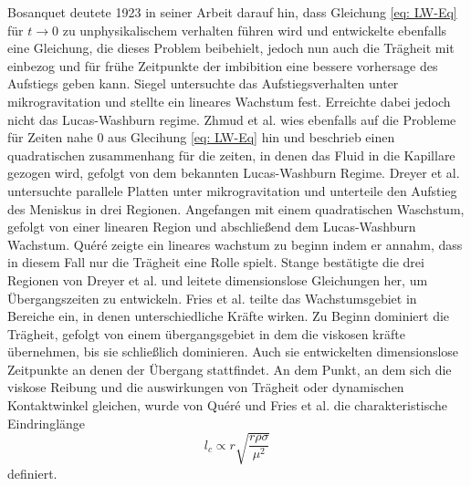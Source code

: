 Bosanquet \cite{bosanquet1923LVFlowLiquids} deutete 1923 in seiner Arbeit darauf hin, dass Gleichung \ref{eq: LW-Eq} für $t\xrightarrow{}0$ zu unphysikalischem verhalten führen wird und entwickelte ebenfalls eine Gleichung, die dieses Problem beibehielt, jedoch nun auch die Trägheit mit einbezog und für frühe Zeitpunkte der imbibition eine bessere vorhersage des Aufstiegs geben kann. 
Siegel \cite{siegel1961TransientCapillaryRise} untersuchte das Aufstiegsverhalten unter mikrogravitation und stellte ein lineares Wachstum fest. Erreichte dabei jedoch nicht das Lucas-Washburn regime. Zhmud et al. \cite{zhmud2000DynamicsCapillaryRise} wies ebenfalls auf die Probleme für Zeiten nahe $0$ aus Glecihung \ref{eq: LW-Eq} hin und beschrieb einen quadratischen zusammenhang für die zeiten, in denen das Fluid in die Kapillare gezogen wird, gefolgt von dem bekannten Lucas-Washburn Regime.
Dreyer et al. \cite{dreyer1994CapillaryRiseLiquid} untersuchte parallele Platten unter mikrogravitation und unterteile den Aufstieg des Meniskus in drei Regionen. Angefangen mit einem quadratischen Waschstum, gefolgt von einer linearen Region und abschließend dem Lucas-Washburn Wachstum. Quéré \cite{quere1997InertialCapillarity} zeigte ein lineares wachstum zu beginn indem er annahm, dass in diesem Fall nur die Trägheit eine Rolle spielt. Stange \cite{stange2003CapillaryDrivenFlow} bestätigte die drei Regionen von Dreyer et al. \cite{dreyer1994CapillaryRiseLiquid} und leitete dimensionslose Gleichungen her, um Übergangszeiten zu entwickeln. 
Fries et al. \cite{fries2008TransitionInertialViscous} teilte das Wachstumsgebiet in Bereiche ein, in denen unterschiedliche Kräfte wirken. Zu Beginn dominiert die Trägheit, gefolgt von einem übergangsgebiet in dem die viskosen kräfte übernehmen, bis sie schließlich dominieren. Auch sie entwickelten dimensionslose Zeitpunkte an denen der Übergang stattfindet. 
An dem Punkt, an dem sich die viskose Reibung und die auswirkungen von Trägheit oder dynamischen Kontaktwinkel gleichen, wurde von Quéré \cite{quere1997InertialCapillarity} und Fries et al. \cite{fries2008TransitionInertialViscous} die charakteristische Eindringlänge
\begin{equation}
    \label{eq: charLength}
    l_c \propto r \sqrt{\frac{r\rho \sigma}{\mu^2}}
\end{equation}
definiert. 



